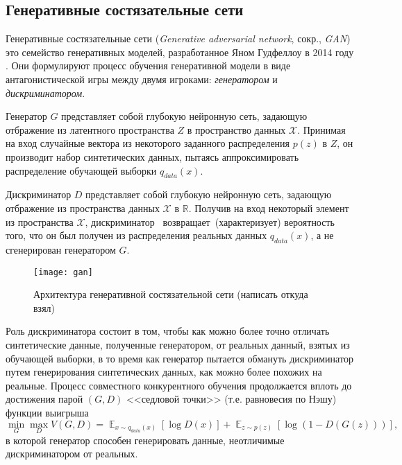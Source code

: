 \label{sec:relatedworks}
\subsection{Генеративные состязательные сети}

Генеративные состязательные сети (\emph{Generative adversarial network}, сокр., \emph{GAN})  это семейство генеративных моделей, разработанное Яном Гудфеллоу в 2014 году \cite{goodfellow2014generative}.  Они формулируют процесс обучения  генеративной модели в виде антагонистической игры между двумя игроками: \emph{генератором} и \emph{дискриминатором}.

Генератор $G$ представляет собой глубокую нейронную сеть, задающую отбражение из латентного пространства $Z$ в пространство данных $\mathcal X$.
Принимая на вход случайные вектора из некоторого заданного распределения $p(z)$ в $Z$, он производит набор синтетических данных, пытаясь аппроксимировать распределение обучающей выборки $q_{data}(x)$.

Дискриминатор $D$ представляет собой глубокую нейронную сеть, задающую отбражение из пространства данных $\mathcal X$ в $\mathbb R$. Получив на вход некоторый элемент из пространства $\mathcal X$, дискриминатор ~возвращает~(характеризует) вероятность того, что он был получен из распределения реальных данных $q_{data}(x)$, а не сгенерирован генератором $G$.

\begin{figure}[h]
\begin{center}
    \texttt{[image: gan]}
    \caption{Архитектура генеративной состязательной сети (написать откуда взял)}
    \label{fig:subim11}
\end{center}
\end{figure}

Роль дискриминатора состоит в том, чтобы как можно более точно отличать синтетические данные, полученные генератором, от реальных данный, взятых из обучающей выборки, в то время как генератор пытается обмануть дискриминатор путем генерирования синтетических данных, как можно более похожих на реальные.
Процесс совместного конкурентного обучения продолжается вплоть до достижения парой $(G, D)$ <<седловой точки>> (т.е. равновесия по Нэшу) \cite{goodfellow2017nips} функции выигрыша
$$
\min_{G} \max_{D} V(G, D) = \mathop{\mathbb{E}}_{x \sim q_{data}(x)} [\log D(x)] + \mathop{\mathbb{E}}_{z \sim p(z)} [\log (1 - D(G(z)))] ,
$$
в которой генератор способен генерировать данные, неотличимые дискриминатором от реальных.

